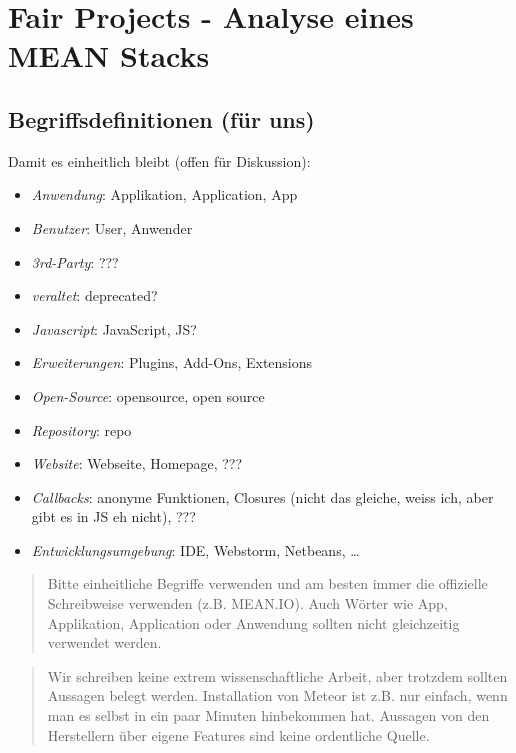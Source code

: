 \documentclass[]{article}
\date{}
\begin{document}
\section{Fair Projects - Analyse eines MEAN
Stacks}\label{fair-projects---analyse-eines-mean-stacks}

\subsection{Begriffsdefinitionen (für
uns)}\label{begriffsdefinitionen-fuxfcr-uns}

Damit es einheitlich bleibt (offen für Diskussion):

\begin{itemize}
\itemsep1pt\parskip0pt
\item
  \emph{Anwendung}: Applikation, Application, App
\item
  \emph{Benutzer}: User, Anwender
\item
  \emph{3rd-Party}: ???
\item
  \emph{veraltet}: deprecated?
\item
  \emph{Javascript}: JavaScript, JS?
\item
  \emph{Erweiterungen}: Plugins, Add-Ons, Extensions
\item
  \emph{Open-Source}: opensource, open source
\item
  \emph{Repository}: repo
\item
  \emph{Website}: Webseite, Homepage, ???
\item
  \emph{Callbacks}: anonyme Funktionen, Closures (nicht das gleiche,
  weiss ich, aber gibt es in JS eh nicht), ???
\item
  \emph{Entwicklungsumgebung}: IDE, Webstorm, Netbeans, \ldots{}
\end{itemize}

\begin{quote}
Bitte einheitliche Begriffe verwenden und am besten immer die offizielle
Schreibweise verwenden (z.B. MEAN.IO). Auch Wörter wie App, Applikation,
Application oder Anwendung sollten nicht gleichzeitig verwendet werden.
\end{quote}

\begin{quote}
Wir schreiben keine extrem wissenschaftliche Arbeit, aber trotzdem
sollten Aussagen belegt werden. Installation von Meteor ist z.B. nur
einfach, wenn man es selbst in ein paar Minuten hinbekommen hat.
Aussagen von den Herstellern über eigene Features sind keine ordentliche
Quelle.
\end{quote}
\end{document}
